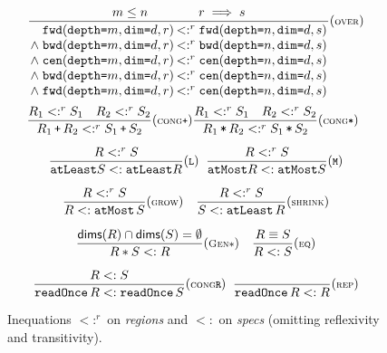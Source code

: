 \documentclass[10pt,preprint]{sigplanconf}
\theoremstyle{definition}
\newcommand{\term}[1]{\texttt{#1}}
\newcommand{\stenFwdSR}[3]{\term{fwd} (\term{depth=}#1,
  \term{dim=}#2, #3)}
\newcommand{\stenBwdSR}[3]{\term{bwd} (\term{depth=}#1,
  \term{dim=}#2, #3)}
\newcommand{\stenCenSR}[3]{\term{cen} (\term{depth=}#1,
  \term{dim=}#2, #3)}
\newcommand{\trule}[1]{{\footnotesize{(\text{#1})}}}
\begin{document}
\begin{figure}[t]
\begin{align*}
\hspace{-0.5em}
\begin{array}{c}
%
\vspace{-0.4em}
\setlength{\arraycolsep}{0.1em}
\dfrac{\hspace{3em} m \leq n \qquad\qquad r \implies s \hspace{3em}}
{\begin{array}{rl}
\stenFwdSR{m}{d}{r} & <:^r \stenFwdSR{n}{d}{s}
\\
\wedge \; \stenBwdSR{m}{d}{r} & <:^r \stenBwdSR{n}{d}{s}
\\
\wedge \; \stenCenSR{m}{d}{r} & <:^r \stenCenSR{n}{d}{s}
\\
\wedge \; \stenBwdSR{m}{d}{r} & <:^r \stenCenSR{n}{d}{s} \\
\wedge \; \stenFwdSR{m}{d}{r} & <:^r \stenCenSR{n}{d}{s} \\[1.2em]
\end{array}}\trule{\textsc{over}} \\[-0.2em]
\hspace{-0.5em}
\dfrac{R_1 <:^r S_1 \quad R_2 <:^r S_2}
      {R_1 \, \texttt{+} \, R_2 <:^r S_1 \, \texttt{+} \, S_2}
\trule{\textsc{cong}\texttt{+}}
\dfrac{R_1 <:^r S_1 \quad R_2 <:^r S_2}
      {R_1 \, \texttt{*} \, R_2 <:^r S_1 \, \texttt{*} \, S_2}
\trule{\textsc{cong}\texttt{*}} \\[1.5em]
%
%
\dfrac{R <:^r S}{\term{atLeast}  S <: \term{atLeast}
  R}\trule{\texttt{L}}
\;\;
\dfrac{R <:^r S}{\term{atMost}  R <: \term{atMost}
  S}\trule{\texttt{M}} \\[1.5em]
\dfrac{R <:^r S}{R <: \term{atMost} \, S}\trule{\textsc{grow}} \quad
\dfrac{R <:^r S}{S <: \term{atLeast} \, R}\trule{\textsc{shrink}} \quad
 \\[1.5em]
\dfrac{\mathsf{dims}(R) \cap \mathsf{dims}(S) = \emptyset}{R \ast S <: R}
\trule{\textsc{Gen$\ast$}}
\quad
\dfrac{R \equiv S}{R <: S}\trule{\textsc{eq}}
\\[1.5em]
\dfrac{R <: S}{\term{readOnce} \, R <: \term{readOnce} \,
  S}\trule{\textsc{cong}\texttt{R}}
\;\;
\dfrac{}{\term{readOnce} \, R <: R}\trule{\textsc{rep}}
\end{array}
\end{align*}
\caption{Inequations $<:^r$ on \textit{regions} and
$<:$ on \textit{specs} (omitting reflexivity
and transitivity). }
\label{fig:inequations}
\vspace{-0.8em}
\end{figure}
\end{document}
